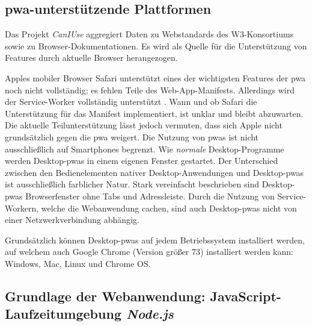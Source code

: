 \subsection{\ac{pwa}-unterstützende Plattformen}
Das Projekt \textit{CanIUse} aggregiert Daten zu Webstandards des W3-Konsortiums sowie zu Browser-Dokumentationen. Es wird als Quelle für die Unterstützung von Features durch aktuelle Browser herangezogen.

Apples mobiler Browser Safari unterstützt eines der wichtigsten Features der \ac{pwa} noch nicht vollständig; es fehlen Teile des Web-App-Manifests. Allerdings wird der Service-Worker vollständig unterstützt \cite{CanIUseWebManifest}. Wann und ob Safari die Unterstützung für das Manifest implementiert, ist unklar und bleibt abzuwarten. Die aktuelle Teilunterstützung lässt jedoch vermuten, dass sich Apple nicht grundsätzlich gegen die \ac{pwa} weigert.
Die Nutzung von \ac{pwa}s ist nicht ausschließlich auf Smartphones begrenzt. Wie \textit{normale} Desktop-Programme werden Desktop-\acp{pwa} in einem eigenen Fenster gestartet. 
Der Unterschied zwischen den Bedienelementen nativer Desktop-Anwendungen und Desktop-\acp{pwa} ist ausschließlich farblicher Natur. Stark vereinfacht beschrieben sind Desktop-\acp{pwa} Browserfenster ohne Tabs und Adressleiste. Durch die Nutzung von Service-Workern, welche die Webanwendung cachen, sind auch Desktop-\acp{pwa} nicht von einer Netzwerkverbindung abhängig.

Grundsätzlich können Desktop-\acp{pwa} auf jedem Betriebssystem installiert werden, auf welchem auch Google Chrome (Version größer 73) installiert werden kann: Windows, Mac, Linux und Chrome OS.
\cite{GooglePWADesktop}
%



\subsection{Grundlage der Webanwendung: JavaScript-Laufzeitumgebung \textit{Node.js}}

